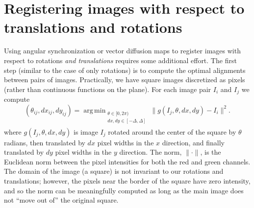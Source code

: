 \documentclass{pnastwo}
\DeclareMathOperator*{\argmin}{arg\,min}
\begin{document}
\section{Registering images with respect to translations and rotations} \label{subsec:trans_rot_register}

Using angular synchronization or vector diffusion maps to register images with respect to rotations {\it and translations} requires some additional effort.
%
%
%
The first step (similar to the case of only rotations) is to compute the optimal alignments between pairs of images.
%
Practically, we have square images discretized as pixels (rather than continuous functions on the plane).
%
For each image pair $I_i$ and $I_j$ we compute
\begin{equation}\label{eq:opt_pairwise}
(\theta_{ij}, dx_{ij}, dy_{ij}) = \argmin_{
\begin{matrix}
\theta \in [0, 2\pi) \\
dx, dy \in [-\Delta, \Delta]\\
\end{matrix}
} \|g(I_j, \theta, dx, dy) - I_i \|^2.
\end{equation}
where $g(I_j, \theta, dx, dy)$ is image $I_j$ rotated around the center of the square by $\theta$ radians, then translated by $dx$ pixel widths in the $x$ direction, and finally translated by $dy$ pixel widths in the $y$ direction.
%
The norm, $\| \cdot \|$, is the Euclidean norm between the pixel intensities for both the red and green channels.
%
The domain of the image (a square) is not invariant to our rotations and translations; however, the pixels near the border of the square have zero intensity, and so the norm can be meaningfully computed as long as the main image does not ``move out of'' the original square.
%
\end{document}

